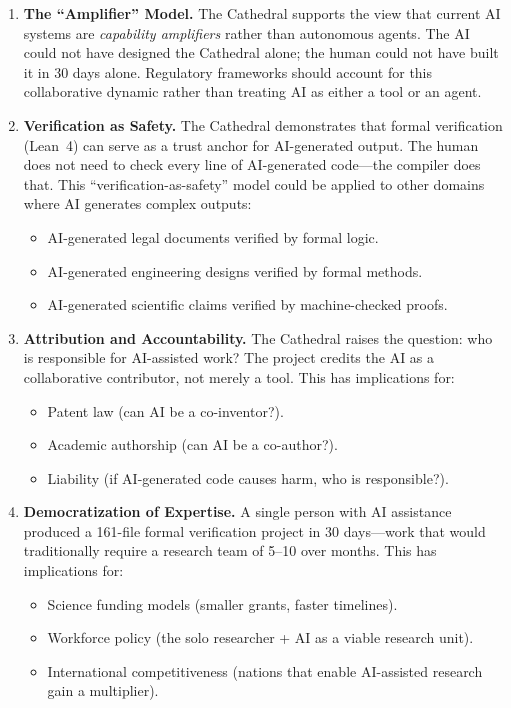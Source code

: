 \documentclass[11pt,a4paper]{article}
\begin{document}
\begin{enumerate}
  \item \textbf{The ``Amplifier'' Model.} The Cathedral supports
    the view that current AI systems are \emph{capability amplifiers}
    rather than autonomous agents. The AI could not have designed the
    Cathedral alone; the human could not have built it in 30 days
    alone. Regulatory frameworks should account for this collaborative
    dynamic rather than treating AI as either a tool or an agent.

  \item \textbf{Verification as Safety.} The Cathedral demonstrates
    that formal verification (Lean~4) can serve as a trust anchor
    for AI-generated output. The human does not need to check every
    line of AI-generated code---the compiler does that. This
    ``verification-as-safety'' model could be applied to other
    domains where AI generates complex outputs:
    \begin{itemize}
      \item AI-generated legal documents verified by formal logic.
      \item AI-generated engineering designs verified by formal
        methods.
      \item AI-generated scientific claims verified by machine-checked
        proofs.
    \end{itemize}

  \item \textbf{Attribution and Accountability.} The Cathedral raises
    the question: who is responsible for AI-assisted work? The
    project credits the AI as a collaborative contributor, not merely
    a tool. This has implications for:
    \begin{itemize}
      \item Patent law (can AI be a co-inventor?).
      \item Academic authorship (can AI be a co-author?).
      \item Liability (if AI-generated code causes harm, who is
        responsible?).
    \end{itemize}

  \item \textbf{Democratization of Expertise.} A single person with
    AI assistance produced a 161-file formal verification project in
    30 days---work that would traditionally require a research team
    of 5--10 over months. This has implications for:
    \begin{itemize}
      \item Science funding models (smaller grants, faster timelines).
      \item Workforce policy (the solo researcher + AI as a viable
        research unit).
      \item International competitiveness (nations that enable
        AI-assisted research gain a multiplier).
    \end{itemize}
\end{enumerate}
\end{document}
